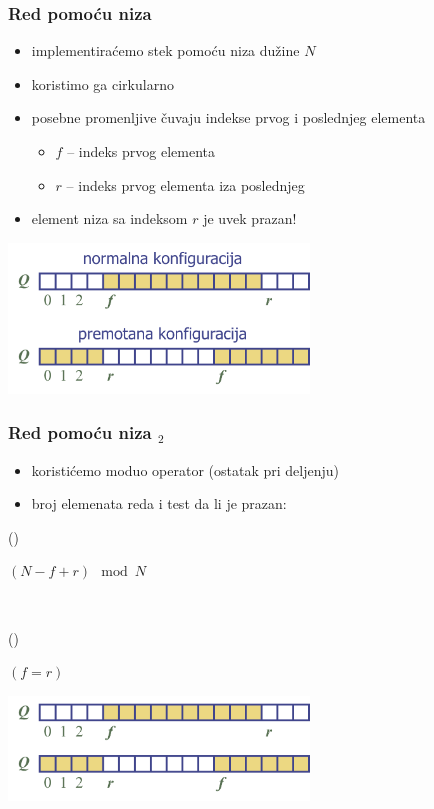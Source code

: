 \documentclass[compress]{beamer}
\begin{document}
\begin{frame}[fragile]
  \frametitle{Red pomoću niza}
  \begin{itemize}
    \item implementiraćemo stek pomoću niza dužine $N$
    \item koristimo ga cirkularno
    \item posebne promenljive čuvaju indekse prvog i poslednjeg elementa
    \begin{itemize}
      \item $f$ -- indeks prvog elementa
      \item $r$ -- indeks prvog elementa iza poslednjeg
    \end{itemize}
    \item element niza sa indeksom $r$ je uvek prazan!      
  \end{itemize}
  \begin{center}
    \includegraphics[width=8cm]{asp-06-pic01.png}
  \end{center}
\end{frame}

\begin{frame}[fragile]
  \frametitle{Red pomoću niza $_2$}
  \begin{itemize}
    \item koristićemo moduo operator (ostatak pri deljenju)
    \item broj elemenata reda i test da li je prazan:
  \end{itemize}
()
\begin{algorithmic}
\RETURN $(N-f+r) \mod N$
\end{algorithmic}

\ %

()
\begin{algorithmic}
\RETURN $(f=r)$
\end{algorithmic}
\begin{center}
  \includegraphics[width=8cm]{asp-06-pic02.png}
\end{center}
\end{frame}
\end{document}

